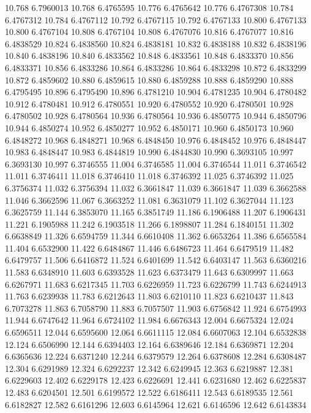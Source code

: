 10.768 6.7960013
10.768 6.4765595
10.776 6.4765642
10.776 6.4767308
10.784 6.4767312
10.784 6.4767112
10.792 6.4767115
10.792 6.4767133
10.800 6.4767133
10.800 6.4767104
10.808 6.4767104
10.808 6.4767076
10.816 6.4767077
10.816 6.4838529
10.824 6.4838560
10.824 6.4838181
10.832 6.4838188
10.832 6.4838196
10.840 6.4838196
10.840 6.4833562
10.848 6.4833561
10.848 6.4833370
10.856 6.4833371
10.856 6.4833286
10.864 6.4833286
10.864 6.4833298
10.872 6.4833299
10.872 6.4859602
10.880 6.4859615
10.880 6.4859288
10.888 6.4859290
10.888 6.4795495
10.896 6.4795490
10.896 6.4781210
10.904 6.4781235
10.904 6.4780482
10.912 6.4780481
10.912 6.4780551
10.920 6.4780552
10.920 6.4780501
10.928 6.4780502
10.928 6.4780564
10.936 6.4780564
10.936 6.4850775
10.944 6.4850796
10.944 6.4850274
10.952 6.4850277
10.952 6.4850171
10.960 6.4850173
10.960 6.4848272
10.968 6.4848271
10.968 6.4848450
10.976 6.4848452
10.976 6.4848447
10.983 6.4848447
10.983 6.4844819
10.990 6.4844830
10.990 6.3693105
10.997 6.3693130
10.997 6.3746555
11.004 6.3746585
11.004 6.3746544
11.011 6.3746542
11.011 6.3746411
11.018 6.3746410
11.018 6.3746392
11.025 6.3746392
11.025 6.3756374
11.032 6.3756394
11.032 6.3661847
11.039 6.3661847
11.039 6.3662588
11.046 6.3662596
11.067 6.3663252
11.081 6.3631079
11.102 6.3627044
11.123 6.3625759
11.144 6.3853070
11.165 6.3851749
11.186 6.1906488
11.207 6.1906431
11.221 6.1905988
11.242 6.1903518
11.266 6.1898807
11.284 6.1840151
11.302 6.6638849
11.326 6.6594759
11.344 6.6610408
11.362 6.6653264
11.386 6.6565584
11.404 6.6532900
11.422 6.6484867
11.446 6.6486723
11.464 6.6479519
11.482 6.6479757
11.506 6.6416872
11.524 6.6401699
11.542 6.6403147
11.563 6.6360216
11.583 6.6348910
11.603 6.6393528
11.623 6.6373479
11.643 6.6309997
11.663 6.6267971
11.683 6.6217345
11.703 6.6226959
11.723 6.6226799
11.743 6.6244913
11.763 6.6239938
11.783 6.6212643
11.803 6.6210110
11.823 6.6210437
11.843 6.7073278
11.863 6.7058790
11.883 6.7057507
11.903 6.6756842
11.924 6.6754993
11.944 6.6747642
11.964 6.6724102
11.984 6.6676343
12.004 6.6675324
12.024 6.6596511
12.044 6.6595600
12.064 6.6611115
12.084 6.6607063
12.104 6.6532838
12.124 6.6506990
12.144 6.6394403
12.164 6.6389646
12.184 6.6369871
12.204 6.6365636
12.224 6.6371240
12.244 6.6379579
12.264 6.6378608
12.284 6.6308487
12.304 6.6291989
12.324 6.6292237
12.342 6.6249945
12.363 6.6219887
12.381 6.6229603
12.402 6.6229178
12.423 6.6226691
12.441 6.6231680
12.462 6.6225837
12.483 6.6204501
12.501 6.6199572
12.522 6.6186411
12.543 6.6189535
12.561 6.6182827
12.582 6.6161296
12.603 6.6145964
12.621 6.6146596
12.642 6.6143834
